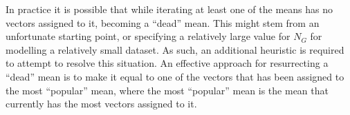 In practice it is possible that while iterating at least one of the means has no vectors assigned to it,
becoming a ``dead'' mean.
This might stem from an unfortunate starting point, 
or specifying a relatively large value for $N_G$ for modelling a relatively small dataset.
As such, an additional heuristic is required to attempt to resolve this situation.
An effective approach for resurrecting a ``dead'' mean is to make it equal to one of the vectors
that has been assigned to the most ``popular'' mean,
where the most ``popular'' mean is the mean that currently has the most vectors assigned to it.



% 
